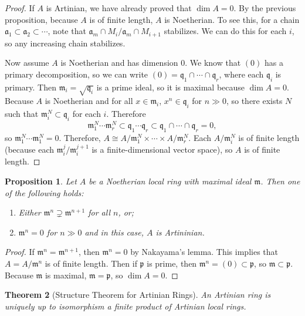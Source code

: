\documentclass[leqno, openany]{memoir}
\newtheorem{thm}{Theorem}[section]
\newtheorem{prop}[thm]{Proposition}
\theoremstyle{definition}
\theoremstyle{remark}
\theoremstyle{plain}
\theoremstyle{definition}
\theoremstyle{remark}
\newcommand{\mf}[1]{\mathfrak{#1}}
\begin{document}
\begin{proof} If $A$ is Artinian, we have already proved that $\dim A = 0$. By
    the previous proposition, because $A$ is of finite length, $A$ is
    Noetherian. To see this, for a chain $\mf{a}_1 \subset \mf{a}_2 \subset
    \cdots$, note that $\mf{a}_m \cap M_i / \mf{a}_m \cap M_{i+1}$ stabilizes.
    We can do this for each $i$, so any increasing chain stabilizes.

    Now assume $A$ is Noetherian and has dimension $0$. We know that $(0)$ has
    a primary decomposition, so we can write $(0) = \mf{q}_1 \cap \cdots \cap
    \mf{q}_r$, where each $\mf{q}_i$ is primary. Then $\mf{m}_i =
    \sqrt{\mf{q}_i}$ is a prime ideal, so it is maximal because $\dim A = 0$.
    Because $A$ is Noetherian and for all $x \in \mf{m}_i$, $x^n \in \mf{q}_i$
    for $n \gg 0$, so there exists $N$ such that $\mf{m}_i^N \subset \mf{q}_i$
    for each $i$. Therefore \[ \mf{m}_1^N \cdots \mf{m}_r^N \subset \mf{q}_1
    \cdots \mf{q}_r \subset \mf{q}_1 \cap \cdots \cap \mf{q}_r = 0, \] so
    $\mf{m}_1^N \cdots \mf{m}_1^N = 0$. Therefore, $A \cong A / \mf{m}_1^N
    \times \cdots \times A / \mf{m}_r^N$. Each $A / \mf{m}_i^N$ is of finite
    length (because each $\mf{m}_i^j / \mf{m}_i^{j+1}$ is a finite-dimensional
    vector space), so $A$ is of finite length.  \end{proof}

\begin{prop} Let $A$ be a Noetherian local ring with maximal ideal $\mf{m}$.
    Then one of the following holds: \begin{enumerate}[label=(\alph*)] \item
        Either $\mf{m}^n \supsetneq \mf{m}^{n+1}$ for all $n$, or; \item
        $\mf{m}^n = 0$ for $n \gg 0$ and in this case, $A$ is Artininian.
\end{enumerate} \end{prop}

\begin{proof} If $\mf{m}^n = \mf{m}^{n+1}$, then $\mf{m}^n = 0$ by Nakayama's
    lemma. This implies that $A = A / \mf{m}^n$ is of finite length. Then if
    $\mf{p}$ is prime, then $\mf{m}^n = (0) \subset \mf{p}$, so $\mf{m} \subset
    \mf{p}$. Because $\mf{m}$ is maximal, $\mf{m} = \mf{p}$, so $\dim A = 0$.
\end{proof}

\begin{thm}[Structure Theorem for Artinian Rings] An Artinian ring is uniquely
up to isomorphism a finite product of Artinian local rings.  \end{thm}
\end{document}
